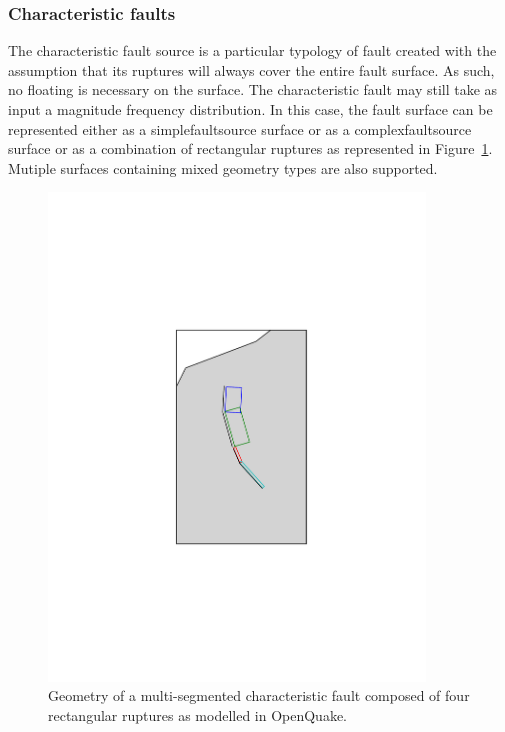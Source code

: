 \subsubsection{Characteristic faults}
\label{desc_characteristic_fault}

The characteristic fault source is a particular typology of fault created
with the assumption that its ruptures will always cover the entire fault
surface. As such, no floating is necessary on the surface. The characteristic fault may still take as input a magnitude frequency distribution. In this case, the fault surface can be represented either as a \gls{simplefaultsource} surface or as a \gls{complexfaultsource} surface or as a combination of rectangular ruptures as represented in
Figure~\ref{fig:char_fault_source}. Mutiple surfaces containing mixed geometry types are also supported. 

\begin{figure}[htb]
\centering
\includegraphics[trim=5cm 7cm 5cm 7cm, clip, width=10cm]{figures/hazard/multi_surface.pdf}
\caption{Geometry of a multi-segmented characteristic fault composed of four
         rectangular ruptures as modelled in OpenQuake.}
\label{fig:char_fault_source}
\end{figure}

